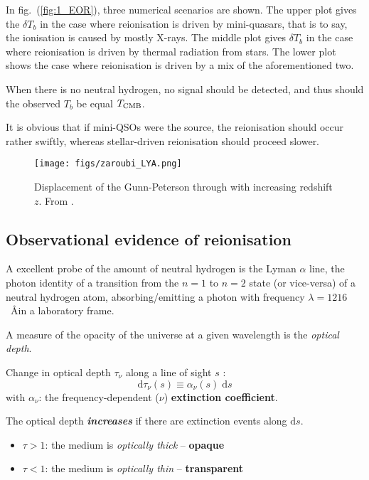 \documentclass[ignorenonframetext]{beamer}
\newcommand{\diff}{\ensuremath{\; \text{d}}}
\newcommand{\diffd}{\ensuremath{\text{d}}}
\begin{document}
In fig.~(\ref{fig:1_EOR}), three numerical scenarios are shown. The upper plot gives the $\delta T_b$ in the case where reionisation is driven by mini-quasars, that is to say, the ionisation is caused by mostly X-rays. The middle plot gives $\delta T_b$ in the case where reionisation is driven by thermal radiation from stars. The lower plot shows the case where reionisation is driven by a mix of the aforementioned two.

When there is no neutral hydrogen, no signal should be detected, and thus should the observed $T_b$ be equal $T_{\rm CMB}$. 

It is obvious that if mini-QSOs were the source, the reionisation should occur rather swiftly, whereas stellar-driven reionisation should proceed slower.

\begin{frame}
    \begin{figure}[htb]
        \centering
        \texttt{[image: figs/zaroubi\_LYA.png]}
        \caption{Displacement of the Gunn-Peterson through with increasing redshift $z$. From .}
        \label{fig:2_LYA}
    \end{figure}

\end{frame}

\subsection{Observational evidence of reionisation}
A excellent probe of the amount of neutral hydrogen is the Lyman $\alpha$ line, the photon identity of a transition from the $n=1$ to $n=2$ state (or vice-versa) of a neutral hydrogen atom, absorbing/emitting a photon with frequency $\lambda = 1216$~\AA in a laboratory frame.

A measure of the opacity of the universe at a given wavelength is the \textit{optical depth}. 

\begin{frame}
    Change in optical depth $\tau_\nu$ along a line of sight $s$ :
    \begin{equation}
        \diffd \tau_\nu(s) \equiv \alpha_{\nu}(s) \diff s
        \label{eq:dtau}
    \end{equation}
    with $\alpha_\nu$: the frequency-dependent ($\nu$) \textbf{extinction coefficient}.

    The optical depth \textbf{\textit{increases}} if there are extinction events along $\diffd s$.

    \begin{itemize}
        \item $\tau > 1$: the medium is \textit{optically thick} -- \textbf{opaque}
        \item $\tau < 1$: the medium is \textit{optically thin} -- \textbf{transparent}
    \end{itemize}

\end{frame}
\end{document}
